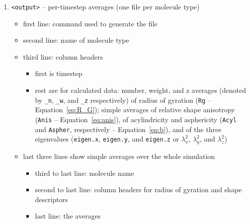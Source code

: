 \begin{enumerate}[nosep,leftmargin=20pt]
  \item \texttt{<output>} -- per-timestep averages (one file per molecule
    type)
    \begin{itemize}[nosep,leftmargin=5pt]
      \item first line: command used to generate the file
      \item second line: name of molecule type
      \item third line: column headers
        \begin{itemize}[nosep,leftmargin=10pt]
          \item first is timestep
          \item rest are for calculated data: number, weight, and z
            averages (denoted by \texttt{\_n}, \texttt{\_w},
            and \texttt{\_z} respectively) of radius of gyration
            (\texttt{Rg} -- Equation~\eqref{eq:R_G}); simple averages of
            relative shape anisotropy
            (\texttt{Anis} -- Equation~\eqref{eq:anis}), of acylindricity
            and asphericity (\texttt{Acyl} and \texttt{Aspher},
            respectively -- Equation~\eqref{eq:b}), and of the three
            eigenvalues (\texttt{eigen.x}, \texttt{eigen.y}, and
            \texttt{eigen.z} or $\lambda_x^2$, $\lambda_y^2$, and
            $\lambda_z^2$)
        \end{itemize}
      \item last three lines show simple averages over the whole simulation
        \begin{itemize}[nosep,leftmargin=5pt]
          \item third to last line: molecule name
          \item second to last line: column headers for radius of gyration
            and shape descriptors
          \item last line: the averages
        \end{itemize}
    \end{itemize}
\end{enumerate}

